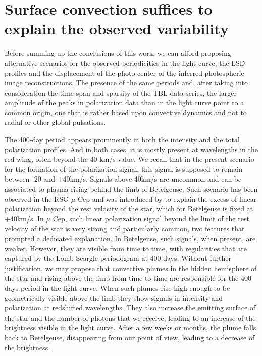 \documentclass{aa}
\begin{document}
\section{Surface convection suffices to explain the observed variability}

Before summing up the conclusions of this work, we can afford proposing alternative scenarios for the observed periodicities in the light curve, 
the LSD profiles and the displacement of the photo-center of the inferred photospheric image reconstructions. The presence of the same 
periods and, after taking into consideration the time span and sparsity of the TBL data series, the larger amplitude of the peaks in
polarization data  than in the light curve point to a common origin, one that is rather based upon convective dynamics and not to radial or 
other global pulsations.


The 400-day period appears prominently in both the intensity and the total polarization profiles. And in both cases, it is mostly present 
at wavelengths in the red wing, often beyond the 40 km/s value.
We recall that in the present scenario for the formation of the polarization signal, this signal is supposed to remain between 
-20 and +40km/s. Signals above 40km/s are uncommon and can be associated to
 plasma rising behind the limb of Betelgeuse. 
Such scenario has been observed in the RSG $\mu$ Cep and was introduced by \cite{lopez_ariste_height_2023} to explain the excess of 
linear polarization beyond  the rest velocity of the star, which for Betelgeuse is fixed at +40km/s. 
In $\mu$ Cep, such  linear polarization signal beyond the limit of the rest velocity of the star is very strong and particularly 
common, two features that prompted a dedicated explanation. In Betelgeuse, such signals, when present, are weaker. However, 
they are visible from time to time, with regularities that are captured by  the Lomb-Scargle periodogram at 400 days.
Without further justification, we may propose that convective plumes in the hidden hemisphere of the star and 
rising above the limb from time to time are responsible for the  400 days period in the light curve. When such plumes rise high enough 
to be geometrically visible above the limb they show signals in intensity and polarization at redshifted wavelengths. They also
 increase the emitting surface of the star and  the number of photons that we receive,
leading to an increase of the brightness visible in the light curve. After a few weeks or months, the plume falls back to Betelgeuse, 
disappearing from our point of view,  leading to a decrease of the brightness.
\end{document}
